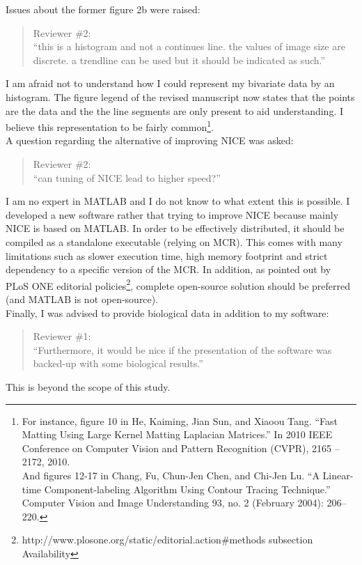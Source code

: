 \documentclass{letter}
\begin{document}
\begin{letter}{}
Issues about the former figure 2b were raised:
 \begin{quote}
	 Reviewer \#2:\\
	``this is a histogram and not a continues line.
the values of image size are discrete. a trendline can be used but it should 
be indicated as such.''
 \end{quote} 
I am afraid not to understand how I could represent my bivariate data by an histogram.
The figure legend of the revised manuscript now states that the points are the data and the the line segments are only present to aid understanding.
 I believe this representation to be fairly common\footnote{
 For instance, figure 10 in He, Kaiming, Jian Sun, and Xiaoou Tang. ``Fast Matting Using Large Kernel Matting Laplacian Matrices.'' In 2010 IEEE Conference on Computer Vision and Pattern Recognition (CVPR), 2165 –2172, 2010.\\
 And figures 12-17 in Chang, Fu, Chun-Jen Chen, and Chi-Jen Lu. ``A Linear-time Component-labeling Algorithm Using Contour Tracing Technique.'' Computer Vision and Image Understanding 93, no. 2 (February 2004): 206–220.
 }.\\
 
	A question regarding the alternative of improving NICE was asked:
 \begin{quote}
	 Reviewer \#2:\\
	``can tuning of NICE lead to higher speed?''
 \end{quote} 
I am no expert in MATLAB and I do not know to what extent this is possible.
I developed a new software rather that trying to improve NICE because mainly NICE is based on MATLAB.
In order to be effectively distributed, it should be compiled as a standalone executable (relying on MCR).
This comes with many limitations such as slower execution time, high memory footprint and strict dependency to a specific version of the MCR.
In addition, as pointed out by PLoS ONE editorial policies\footnote{http://www.plosone.org/static/editorial.action\#methods subsection Availability},
 complete open-source solution should be preferred (and MATLAB is not open-source).\\
 
 Finally, I was advised to provide biological data in addition to my software:
 \begin{quote}
	 Reviewer \#1:\\
	``Furthermore, it would be nice if the presentation of the software was backed-up with some biological results.''
 \end{quote} 
 This is beyond the scope of this study.\\ 


\end{letter}
\end{document}
